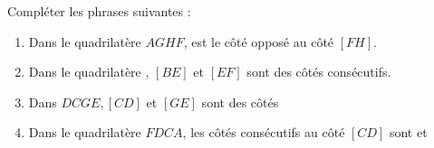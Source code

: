 \begin{exercice*} %
   Compléter les phrases suivantes : 
   \begin{enumerate}
      \item Dans le quadrilatère $AGHF$, \pointilles[2.7cm] est le côté opposé au côté $[FH]$. 
      \item Dans le quadrilatère \pointilles[2.7cm], $[BE]$ et $[EF]$ sont des côtés consécutifs.
      \item Dans $DCGE, [CD]$ et $[GE]$ sont des côtés \pointilles
      \item Dans le quadrilatère $FDCA$, les côtés consécutifs au côté $[CD]$ sont \pointilles[2.7cm] et \pointilles[2.7cm]
   \end{enumerate}
\end{exercice*}
